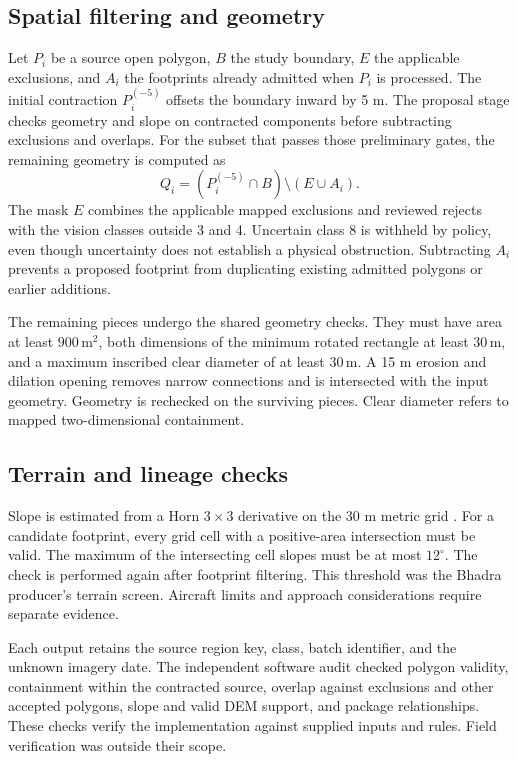 \documentclass[journal]{IEEEtran}
\begin{document}
\subsection{Spatial filtering and geometry}
Let $P_i$ be a source open polygon, $B$ the study boundary, $E$ the applicable exclusions, and $A_i$ the footprints already admitted when $P_i$ is processed. The initial contraction $P_i^{(-5)}$ offsets the boundary inward by 5 m. The proposal stage checks geometry and slope on contracted components before subtracting exclusions and overlaps. For the subset that passes those preliminary gates, the remaining geometry is computed as
\begin{equation}
Q_i = (P_i^{(-5)} \cap B) \setminus (E \cup A_i).
\label{eq:filter}
\end{equation}
The mask $E$ combines the applicable mapped exclusions and reviewed rejects with the vision classes outside 3 and 4. Uncertain class 8 is withheld by policy, even though uncertainty does not establish a physical obstruction. Subtracting $A_i$ prevents a proposed footprint from duplicating existing admitted polygons or earlier additions.

The remaining pieces undergo the shared geometry checks. They must have area at least $900\,\mathrm{m}^2$, both dimensions of the minimum rotated rectangle at least $30\,\mathrm{m}$, and a maximum inscribed clear diameter of at least $30\,\mathrm{m}$. A 15 m erosion and dilation opening removes narrow connections and is intersected with the input geometry. Geometry is rechecked on the surviving pieces. Clear diameter refers to mapped two-dimensional containment.

\subsection{Terrain and lineage checks}
Slope is estimated from a Horn $3 \times 3$ derivative on the 30 m metric grid \cite{horn}. For a candidate footprint, every grid cell with a positive-area intersection must be valid. The maximum of the intersecting cell slopes must be at most $12^\circ$. The check is performed again after footprint filtering. This threshold was the Bhadra producer's terrain screen. Aircraft limits and approach considerations require separate evidence.

Each output retains the source region key, class, batch identifier, and the unknown imagery date. The independent software audit checked polygon validity, containment within the contracted source, overlap against exclusions and other accepted polygons, slope and valid DEM support, and package relationships. These checks verify the implementation against supplied inputs and rules. Field verification was outside their scope.
\end{document}
